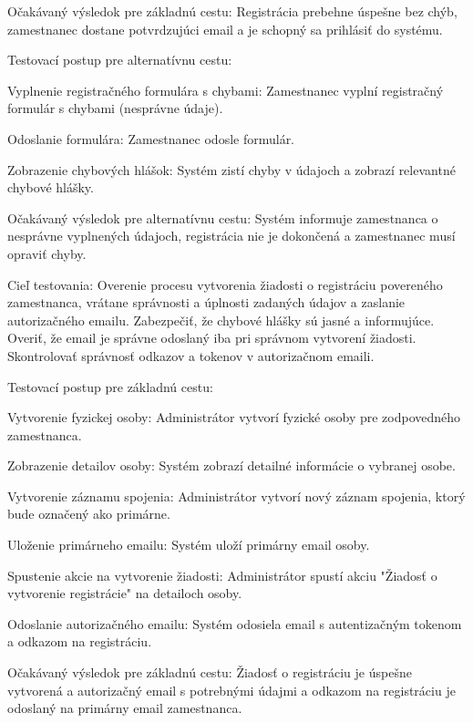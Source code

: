 Očakávaný výsledok pre základnú cestu: Registrácia prebehne úspešne bez chýb, zamestnanec dostane potvrdzujúci email a je schopný sa prihlásiť do systému.

\blank
Testovací postup pre alternatívnu cestu:

\startitemize[n]
\item{Vyplnenie registračného formulára s chybami: Zamestnanec vyplní registračný formulár s chybami (nesprávne údaje).}
\item{Odoslanie formulára: Zamestnanec odosle formulár.}
\item{Zobrazenie chybových hlášok: Systém zistí chyby v údajoch a zobrazí relevantné chybové hlášky.}
\stopitemize

Očakávaný výsledok pre alternatívnu cestu: Systém informuje zamestnanca o nesprávne vyplnených údajoch, registrácia nie je dokončená a zamestnanec musí opraviť chyby.


Cieľ testovania: Overenie procesu vytvorenia žiadosti o registráciu povereného zamestnanca, vrátane správnosti a úplnosti zadaných údajov a zaslanie autorizačného emailu. Zabezpečiť, že chybové hlášky sú jasné a informujúce. Overiť, že email je správne odoslaný iba pri správnom vytvorení žiadosti. Skontrolovať správnosť odkazov a tokenov v autorizačnom emaili.

\blank
Testovací postup pre základnú cestu:

\startitemize[n]
\item{Vytvorenie fyzickej osoby: Administrátor vytvorí fyzické osoby pre zodpovedného zamestnanca.}
\item{Zobrazenie detailov osoby: Systém zobrazí detailné informácie o vybranej osobe.}
\item{Vytvorenie záznamu spojenia: Administrátor vytvorí nový záznam spojenia, ktorý bude označený ako primárne.}
\item{Uloženie primárneho emailu: Systém uloží primárny email osoby.}
\item{Spustenie akcie na vytvorenie žiadosti: Administrátor spustí akciu "Žiadosť o vytvorenie registrácie" na detailoch osoby.}
\item{Odoslanie autorizačného emailu: Systém odosiela email s autentizačným tokenom a odkazom na registráciu.}
\stopitemize

Očakávaný výsledok pre základnú cestu: Žiadosť o registráciu je úspešne vytvorená a autorizačný email s potrebnými údajmi a odkazom na registráciu je odoslaný na primárny email zamestnanca.

